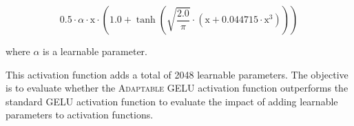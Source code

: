 \[
    0.5 \cdot \alpha \cdot \text{x} \cdot \left( 1.0 + \tanh \left( \sqrt{\frac{2.0}{\pi}} \cdot (\text{x} + 0.044715 \cdot \text{x}^3) \right) \right)
\]

where \(\alpha\) is a learnable parameter. 

This activation function adds a total of 2048 learnable parameters. The objective is to evaluate whether the \textsc{Adaptable GELU} activation function outperforms the standard \textsc{GELU} activation function to evaluate the impact of adding learnable parameters to activation functions.





